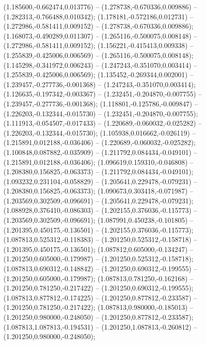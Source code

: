  (1.185600,-0.662474,0.013776) -- (1.278738,-0.670336,0.009886) -- (1.282313,-0.766488,0.010342);
 (1.178181,-0.572186,0.012731) -- (1.272986,-0.581411,0.009152) -- (1.278738,-0.670336,0.009886);
 (1.168073,-0.490289,0.011307) -- (1.265116,-0.500075,0.008148) -- (1.272986,-0.581411,0.009152);
 (1.156221,-0.415413,0.009338) -- (1.255839,-0.425006,0.006569) -- (1.265116,-0.500075,0.008148);
 (1.145298,-0.341972,0.006243) -- (1.247243,-0.351070,0.003414) -- (1.255839,-0.425006,0.006569);
 (1.135452,-0.269344,0.002001) -- (1.239457,-0.277736,-0.001368) -- (1.247243,-0.351070,0.003414);
 (1.126635,-0.197342,-0.003367) -- (1.232451,-0.204870,-0.007755) -- (1.239457,-0.277736,-0.001368);
 (1.118801,-0.125786,-0.009847) -- (1.226203,-0.132344,-0.015730) -- (1.232451,-0.204870,-0.007755);
 (1.111913,-0.054507,-0.017433) -- (1.220689,-0.060032,-0.025282) -- (1.226203,-0.132344,-0.015730);
 (1.105938,0.016662,-0.026119) -- (1.215891,0.012188,-0.036406) -- (1.220689,-0.060032,-0.025282);
 (1.100848,0.087882,-0.035909) -- (1.211792,0.084434,-0.049101) -- (1.215891,0.012188,-0.036406);
 (1.096619,0.159310,-0.046808) -- (1.208380,0.156825,-0.063373) -- (1.211792,0.084434,-0.049101);
 (1.093232,0.231104,-0.058829) -- (1.205641,0.229478,-0.079231) -- (1.208380,0.156825,-0.063373);
 (1.090673,0.303418,-0.071987) -- (1.203569,0.302509,-0.096691) -- (1.205641,0.229478,-0.079231);
 (1.088928,0.376410,-0.086303) -- (1.202155,0.376036,-0.115773) -- (1.203569,0.302509,-0.096691);
 (1.087991,0.450238,-0.101805) -- (1.201395,0.450175,-0.136501) -- (1.202155,0.376036,-0.115773);
 (1.087813,0.525312,-0.118383) -- (1.201250,0.525312,-0.158718) -- (1.201395,0.450175,-0.136501);
 (1.087812,0.605000,-0.134247) -- (1.201250,0.605000,-0.179987) -- (1.201250,0.525312,-0.158718);
 (1.087813,0.690312,-0.148842) -- (1.201250,0.690312,-0.199555) -- (1.201250,0.605000,-0.179987);
 (1.087813,0.781250,-0.162168) -- (1.201250,0.781250,-0.217422) -- (1.201250,0.690312,-0.199555);
 (1.087813,0.877812,-0.174225) -- (1.201250,0.877812,-0.233587) -- (1.201250,0.781250,-0.217422);
 (1.087813,0.980000,-0.185013) -- (1.201250,0.980000,-0.248050) -- (1.201250,0.877812,-0.233587);
 (1.087813,1.087813,-0.194531) -- (1.201250,1.087813,-0.260812) -- (1.201250,0.980000,-0.248050);
